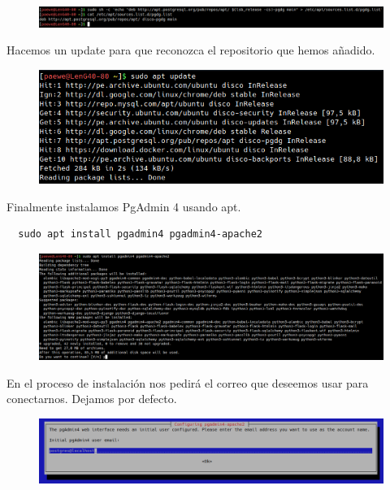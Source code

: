 \documentclass{article}
\begin{document}
\begin{figure}[h!]
  \centering
  \includegraphics[scale=0.5]{./Pictures/261_pgadmin_list.png}
\end{figure}

Hacemos un update para que reconozca el repositorio que hemos añadido.

\begin{figure}[h!]
  \centering
  \includegraphics[scale=0.5]{./Pictures/262_apt_update.png}
\end{figure}

Finalmente instalamos PgAdmin 4 usando apt.

\begin{verbatim}
  sudo apt install pgadmin4 pgadmin4-apache2
\end{verbatim}

\begin{figure}[h!]
  \centering
  \includegraphics[scale=0.5]{./Pictures/263_pgadmin_install.png}
\end{figure}

En el proceso de instalación nos pedirá el correo que deseemos usar para
conectarnos. Dejamos por defecto.

\begin{figure}[h!]
  \centering
  \includegraphics[scale=0.5]{./Pictures/264_package_configuration.png}
\end{figure}
\end{document}
